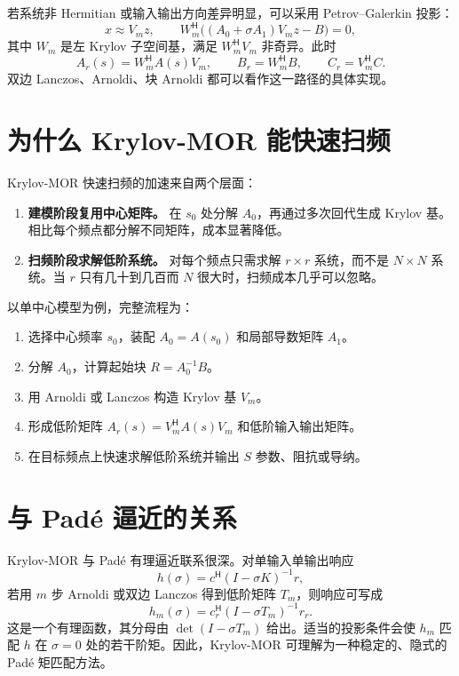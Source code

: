 \documentclass[UTF8,a4paper,11pt]{ctexart}
\newcommand{\herm}{\mathsf{H}}
\begin{document}
若系统非 Hermitian 或输入输出方向差异明显，可以采用 Petrov--Galerkin 投影：
\[
    x\approx V_mz,\qquad
    W_m^{\herm}\bigl((A_0+\sigma A_1)V_mz-B\bigr)=0,
\]
其中 $W_m$ 是左 Krylov 子空间基，满足 $W_m^{\herm}V_m$ 非奇异。此时
\begin{equation}
    A_r(s)=W_m^{\herm}A(s)V_m,\qquad
    B_r=W_m^{\herm}B,\qquad
    C_r=V_m^{\herm}C .
    \label{eq:petrov}
\end{equation}
双边 Lanczos、Arnoldi、块 Arnoldi 都可以看作这一路径的具体实现。

\section{为什么 Krylov-MOR 能快速扫频}

Krylov-MOR 快速扫频的加速来自两个层面：
\begin{enumerate}
    \item \textbf{建模阶段复用中心矩阵。} 在 $s_0$ 处分解 $A_0$，再通过多次回代生成 Krylov 基。相比每个频点都分解不同矩阵，成本显著降低。
    \item \textbf{扫频阶段求解低阶系统。} 对每个频点只需求解 $r\times r$ 系统，而不是 $N\times N$ 系统。当 $r$ 只有几十到几百而 $N$ 很大时，扫频成本几乎可以忽略。
\end{enumerate}

以单中心模型为例，完整流程为：
\begin{enumerate}
    \item 选择中心频率 $s_0$，装配 $A_0=A(s_0)$ 和局部导数矩阵 $A_1$。
    \item 分解 $A_0$，计算起始块 $R=A_0^{-1}B$。
    \item 用 Arnoldi 或 Lanczos 构造 Krylov 基 $V_m$。
    \item 形成低阶矩阵 $A_r(s)=V_m^{\herm}A(s)V_m$ 和低阶输入输出矩阵。
    \item 在目标频点上快速求解低阶系统并输出 $S$ 参数、阻抗或导纳。
\end{enumerate}

\section{与 Padé 逼近的关系}

Krylov-MOR 与 Padé 有理逼近联系很深。对单输入单输出响应
\[
    h(\sigma)=c^{\herm}(I-\sigma K)^{-1}r,
\]
若用 $m$ 步 Arnoldi 或双边 Lanczos 得到低阶矩阵 $T_m$，则响应可写成
\begin{equation}
    h_m(\sigma)
    =
    c_r^{\herm}(I-\sigma T_m)^{-1}r_r .
    \label{eq:pade-krylov}
\end{equation}
这是一个有理函数，其分母由 $\det(I-\sigma T_m)$ 给出。适当的投影条件会使 $h_m$ 匹配 $h$ 在 $\sigma=0$ 处的若干阶矩。因此，Krylov-MOR 可理解为一种稳定的、隐式的 Padé 矩匹配方法。
\end{document}
